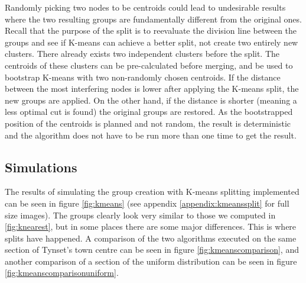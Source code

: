 Randomly picking two nodes to be centroids could lead to undesirable results where the two resulting groups are fundamentally different from the original ones.
Recall that the purpose of the split is to reevaluate the division line between the groups and see if K-means can achieve a better split, not create two entirely new clusters.
There already exists two independent clusters before the split. The centroids of these clusters can be pre-calculated before merging, and be used to bootstrap K-means with two non-randomly chosen
centroids.
If the distance between the most interfering nodes is lower after applying the K-means split, the new groups are applied. On the other hand, if the distance is shorter
(meaning a less optimal cut is found) the original groups are restored. As the bootstrapped position of the centroids is planned and not random,
the result is deterministic and the algorithm does not have to be run more than one time to get the result. 


\subsection{Simulations}
The results of simulating the group creation with K-means splitting implemented can be seen in figure \ref{fig:kmeans} (see 
appendix \ref{appendix:kmeanssplit} for full size images). The groups clearly look very similar to those we computed in \ref{fig:knearest}, but in some places there are some major differences. This is where splits have happened. A comparison of the two algorithms executed on the same section of Tynset's town centre can be seen in figure \ref{fig:kmeanscomparison}, and another
comparison of a section of the uniform distribution can be seen in figure \ref{fig:kmeanscomparisonuniform}. 

